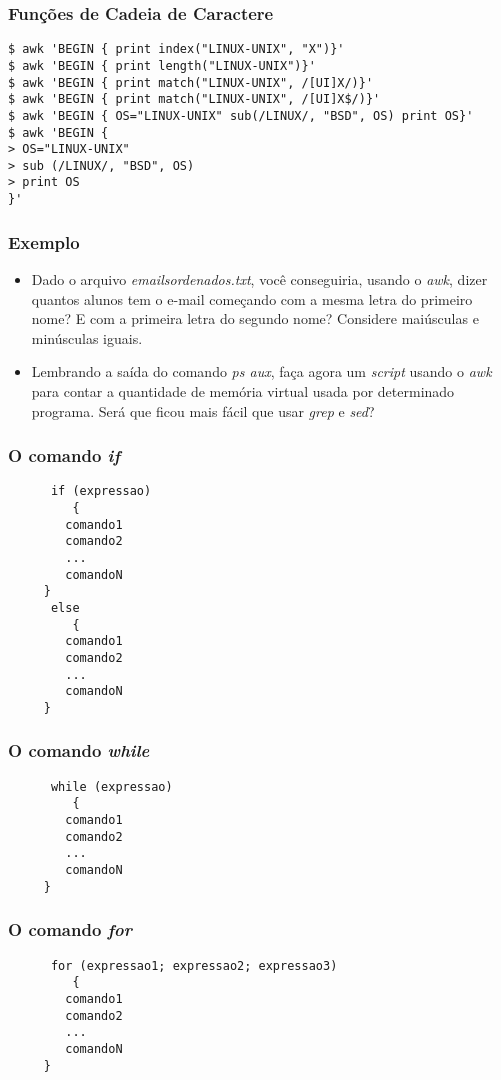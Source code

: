 \documentclass{beamer}
\begin{document}
   \begin{frame}[fragile]
      \frametitle{Funções de Cadeia de Caractere}
      \footnotesize
      \begin{verbatim}
$ awk 'BEGIN { print index("LINUX-UNIX", "X")}'
$ awk 'BEGIN { print length("LINUX-UNIX")}'
$ awk 'BEGIN { print match("LINUX-UNIX", /[UI]X/)}'
$ awk 'BEGIN { print match("LINUX-UNIX", /[UI]X$/)}'
$ awk 'BEGIN { OS="LINUX-UNIX" sub(/LINUX/, "BSD", OS) print OS}'
$ awk 'BEGIN {
> OS="LINUX-UNIX"
> sub (/LINUX/, "BSD", OS)
> print OS
}'
      \end{verbatim}
\end{frame}

   \begin{frame}
      \frametitle{Exemplo}
      \begin{itemize}
         \item Dado o arquivo \textit{emailsordenados.txt}, você conseguiria, usando o \textit{awk}, dizer quantos alunos tem o e-mail começando com a mesma letra do primeiro nome? E com a primeira letra do segundo nome? Considere maiúsculas e minúsculas iguais.
	 \item Lembrando a saída do comando \textit{ps aux}, faça agora um \textit{script} usando o \textit{awk} para contar a quantidade de memória virtual usada por determinado programa. Será que ficou mais fácil que usar \textit{grep} e \textit{sed}?
      \end{itemize}
   \end{frame}

   \begin{frame}[fragile]
      \frametitle{O comando \textit{if}}
      \begin{verbatim}
      if (expressao)
         {
	    comando1
	    comando2
	    ...
	    comandoN
	 }
      else 
         {
	    comando1
	    comando2
	    ...
	    comandoN
	 }
      \end{verbatim}
\end{frame}

   \begin{frame}[fragile]
      \frametitle{O comando \textit{while}}
      \begin{verbatim}
      while (expressao)
         {
	    comando1
	    comando2
	    ...
	    comandoN
	 }
      \end{verbatim}
\end{frame}

   \begin{frame}[fragile]
      \frametitle{O comando \textit{for}}
      \begin{verbatim}
      for (expressao1; expressao2; expressao3)
         {
	    comando1
	    comando2
	    ...
	    comandoN
	 }
      \end{verbatim}
\end{frame}
\end{document}
